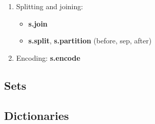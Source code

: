 \documentclass[a4paper, twoside, 8pt]{extarticle}
\newenvironment{enumx} {
	\begin{enumerate}[leftmargin=*]
	\setlength{\topsep}{0pt}
	\setlength{\itemsep}{0pt}
	\setlength{\parskip}{0pt}
	\setlength{\parsep}{0pt}
	}
{\end{enumerate}}
\newenvironment{itemx} {
	\begin{itemize}[leftmargin=*,noitemsep,topsep=0pt]
	}
{\end{itemize}}
\newcommand{\python}[1] {\textbf{\color{blue}#1}}
\begin{document}
\begin{multicols*}{3}
\begin{enumx}
\item Splitting and joining:
\begin{itemx}
	\item \python{s.join} 
	\item \python{s.split},
	      \python{s.partition} (before, sep, after)
\end{itemx}

\item Encoding: 
\python{s.encode} 
\end{enumx}

\subsection{Sets}

\subsection{Dictionaries}

\end{multicols*}
\end{document}
